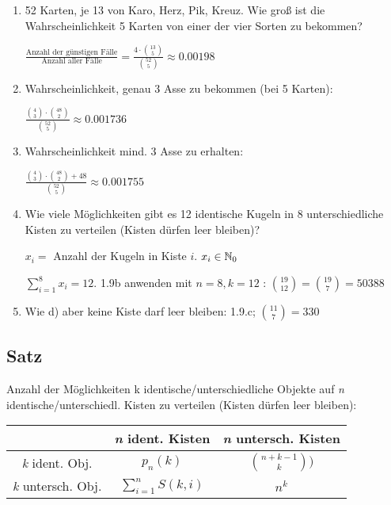 \begin{enumerate}
	\item
	52 Karten, je 13 von Karo, Herz, Pik, Kreuz.
	Wie groß ist die Wahrscheinlichkeit 5 Karten von einer der vier Sorten zu bekommen?
	
	$\frac{\text{Anzahl der günstigen Fälle}}{\text{Anzahl aller Fälle}}
	= \frac{4 \cdot \binom{13}{5}}{\binom{52}{5}}
	\approx 0.00198$
	
	\item 
	Wahrscheinlichkeit, genau 3 Asse zu bekommen (bei 5 Karten):
	
	$\frac{\binom{4}{3} \cdot \binom{48}{2}}{\binom{52}{5}} \approx 0.001736$
	
	\item
	Wahrscheinlichkeit mind. 3 Asse zu erhalten:
	
	$\frac{\binom{4}{3} \cdot \binom{48}{2} + 48}{\binom{52}{5}} \approx 0.001755$
	
	\item Wie viele Möglichkeiten gibt es 12 identische Kugeln in 8 unterschiedliche Kisten zu verteilen (Kisten dürfen leer bleiben)? 
	
	$x_i = $ Anzahl der Kugeln in Kiste $i$. $x_i \in \operatorname{\mathbb{N}}_0$
	
	$\sum_{i=1}^{8}x_i = 12$. 1.9b %
	anwenden mit $n=8, k=12 $ :
	$\binom{19}{12} = \binom{19}{7} = 50388$
	
	\item
	Wie d) %
	aber keine Kiste darf leer bleiben: 1.9.c; %
	$\binom{11}{7} = 330$
	
	
\end{enumerate}


\subsection{Satz}
Anzahl der Möglichkeiten k identische/unterschiedliche Objekte auf \textit{n} identische/unterschiedl. Kisten zu verteilen (Kisten dürfen leer bleiben):

\begin{tabular}{c|c|c}
	& \textit{n} ident. Kisten & \textit{n} untersch. Kisten \\ \hline
	\textit{k} ident. Obj. &$p_n(k)$ &$\binom{n+k-1}{k})$ \\ \hline
	\textit{k} untersch. Obj. & $\sum_{i=1}^{n} S(k,i)$&$n^k$ 
\end{tabular}

